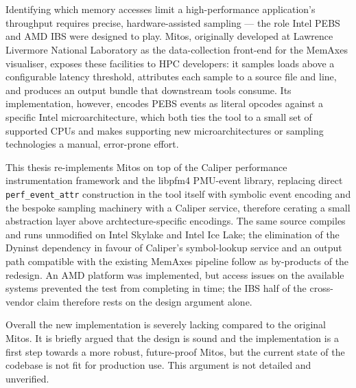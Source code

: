 \chapter{\abstractname}

Identifying which memory accesses limit a high-performance application's throughput requires precise, hardware-assisted sampling --- the role Intel PEBS and AMD IBS were designed to play. Mitos, originally developed at Lawrence Livermore National Laboratory as the data-collection front-end for the MemAxes visualiser, exposes these facilities to HPC developers: it samples loads above a configurable latency threshold, attributes each sample to a source file and line, and produces an output bundle that downstream tools consume. Its implementation, however, encodes PEBS events as literal opcodes against a specific Intel microarchitecture, which both ties the tool to a small set of supported CPUs and makes supporting new microarchitectures or sampling technologies a manual, error-prone effort.

This thesis re-implements Mitos on top of the Caliper performance instrumentation framework and the libpfm4 PMU-event library, replacing direct \texttt{perf\_event\_attr} construction in the tool itself with symbolic event encoding and the bespoke sampling machinery with a Caliper service, therefore cerating a small abstraction layer above archtecture-specific encodings. The same source compiles and runs unmodified on Intel Skylake and Intel Ice Lake; the elimination of the Dyninst dependency in favour of Caliper's symbol-lookup service and an output path compatible with the existing MemAxes pipeline follow as by-products of the redesign. An AMD platform was implemented, but access issues on the available systems prevented the test from completing in time; the IBS half of the cross-vendor claim therefore rests on the design argument alone.

Overall the new implementation is severely lacking compared to the original Mitos. It is briefly argued that the design is sound and the implementation is a first step towards a more robust, future-proof Mitos, but the current state of the codebase is not fit for production use. This argument is not detailed and unverified.
